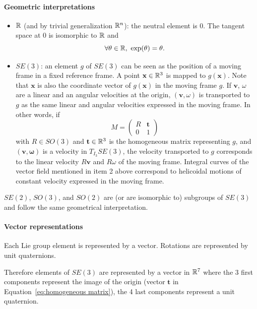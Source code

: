 \paragraph{Geometric interpretations}
\begin{itemize}
\item $\mathbb{R}$ (and by trivial generalization $\mathbb{R}^n$): the neutral element is $0$. The tangent space at 0 is isomorphic to $\mathbb{R}$ and
  $$
  \forall \theta\in\mathbb{R},\  \exp(\theta) = \theta.
  $$
\item $SE(3)$: an element $g$ of $SE(3)$ can be seen as the position of a moving frame in a fixed reference frame. A point $\mathbf{x}\in\mathbb{R}^3$ is mapped to $g(\mathbf{x})$. Note that $\mathbf{x}$ is also the coordinate vector of $g(\mathbf{x})$ in the moving frame $g$. If $\mathbf{v}$, $\omega$ are a linear and an angular velocities at the origin, $(\mathbf{v},\omega)$ is transported to $g$
  as the same linear and angular velocities expressed in the moving frame. In other words, if
  \begin{equation}\label{eq:homogeneous matrix}
  M=\left(\begin{array}{ll} R & \mathbf{t}\\ 0 & 1\end{array}\right)
    \end{equation}
  with $R\in SO(3)$ and $\mathbf{t}\in\mathbb{R}^3$  is the homogeneous matrix
  representing $g$, and $(\mathbf{v},\mathbf{\omega})$ is a velocity in $T_{I_3}SE(3)$, the velocity transported to $g$ corresponds to the linear velocity $R\mathbf{v}$ and $R\omega$ of the moving frame.
  Integral curves of the vector field mentioned in item 2 above correspond to helicoidal motions of constant velocity expressed in the moving frame.
\end{itemize}
$SE(2)$, $SO(3)$, and $SO(2)$ are (or are isomorphic to) subgroups of $SE(3)$ and follow the same geometrical interpretation.

\paragraph{Vector representations}
Each Lie group element is represented by a vector. Rotations are represented by
unit quaternions.

Therefore elements of $SE(3)$ are represented by a vector in $\mathbb{R}^7$ where the 3 first components represent the image of the origin (vector $\mathbf{t}$ in Equation~\ref{eq:homogeneous matrix}), the 4 last components represent a unit quaternion.

